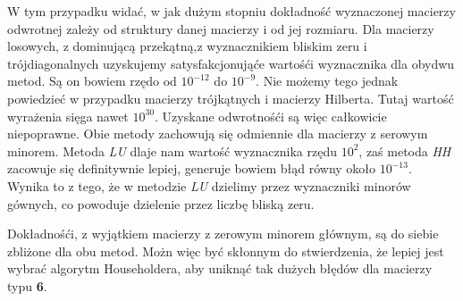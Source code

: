 W tym przypadku widać, w jak dużym stopniu dokładność wyznaczonej macierzy odwrotnej zależy od struktury danej macierzy i od jej rozmiaru. Dla macierzy losowych, z dominującą przekątną,z wyznacznikiem bliskim zeru i trójdiagonalnych uzyskujemy satysfakcjonująće wartośći wyznacznika dla obydwu metod. Są on bowiem rzędo od
$10^{-12}$ do $10^{-9}$.
Nie możemy tego jednak powiedzieć w przypadku macierzy trójkątnych i macierzy Hilberta. Tutaj wartość wyrażenia sięga nawet $10^{30}$. Uzyskane odwrotnośći są więc
całkowicie niepoprawne. Obie metody zachowują się odmiennie dla macierzy z serowym minorem. Metoda \textit{LU} dlaje nam wartość wyznacznika rzędu $10^{2}$, zaś metoda
\textit{HH} zacowuje się definitywnie lepiej, generuje bowiem błąd równy około $10^{-13}$. Wynika to z tego, że w metodzie \textit{LU} dzielimy przez wyznaczniki
minorów gównych, co powoduje dzielenie przez liczbę bliską zeru. 

Dokładnośći, z wyjątkiem macierzy z zerowym minorem głównym, są do siebie zbliżone dla obu metod. Możn więc być skłonnym do stwierdzenia, że lepiej jest wybrać
algorytm Householdera, aby uniknąć tak dużych błędów dla macierzy typu \textbf{6}.

